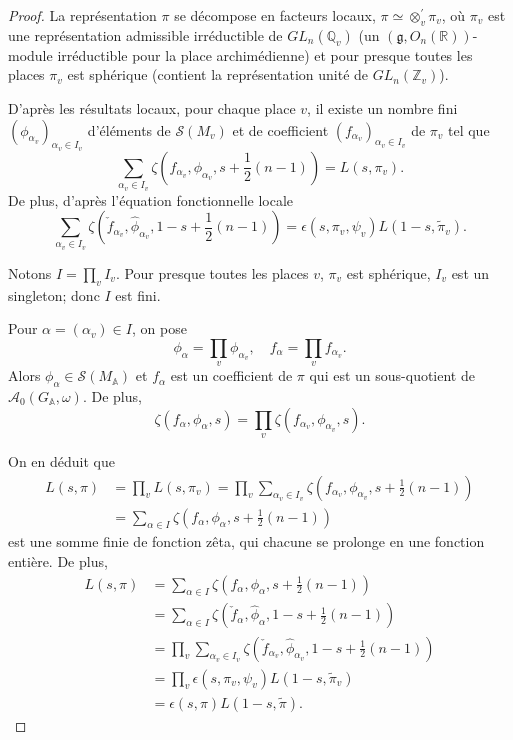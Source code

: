 \begin{proof}
La représentation $\pi$ se décompose en facteurs locaux,
$\pi \simeq \otimes_v^{'} \pi_v$, où $\pi_v$ est une représentation admissible irréductible de $GL_n(\mathbb{Q}_v)$ (un $(\mathfrak{g}, O_n(\mathbb{R}))$-module irréductible pour la place archimédienne) et pour presque toutes les places $\pi_v$ est sphérique (contient la représentation unité de $GL_n(\mathbb{Z}_v)$).

D'après les résultats locaux, pour chaque place $v$, il existe un nombre fini $(\phi_{\alpha_v})_{\alpha_v \in I_v}$ d'éléments de $\mathcal{S}(M_v)$ et de coefficient $(f_{\alpha_v})_{\alpha_v \in I_v}$ de $\pi_v$ tel que
\begin{equation}
\sum_{\alpha_v \in I_v} \zeta(f_{\alpha_v}, \phi_{\alpha_v}, s + \frac{1}{2}(n-1)) = L(s, \pi_v).
\end{equation}
De plus, d'après l'équation fonctionnelle locale
\begin{equation}
\sum_{\alpha_v \in I_v} \zeta(\check{f}_{\alpha_v}, \hat{\phi}_{\alpha_v}, 1-s + \frac{1}{2}(n-1)) = \epsilon(s,\pi_v,\psi_v)L(1-s, \tilde{\pi}_v).
\end{equation}

Notons $I = \prod_v I_v$. Pour presque toutes les places $v$, $\pi_v$ est sphérique, $I_v$ est un singleton; donc $I$ est fini.

Pour $\alpha = (\alpha_v) \in I$, on pose
\begin{equation}
\phi_\alpha = \prod_v \phi_{\alpha_v}, \quad f_\alpha = \prod_v f_{\alpha_v}.
\end{equation}
Alors $\phi_\alpha \in \mathcal{S}(M_\mathbb{A})$ et $f_\alpha$ est un coefficient de $\pi$ qui est un sous-quotient de $\mathcal{A}_0(G_\mathbb{A}, \omega)$. De plus,
\begin{equation}
\zeta(f_\alpha, \phi_\alpha, s) = \prod_v \zeta(f_{\alpha_v}, \phi_{\alpha_v}, s).
\end{equation}

On en déduit que
\begin{align}
L(s, \pi) &= \prod_v L(s, \pi_v) = \prod_v \sum_{\alpha_v \in I_v} \zeta(f_{\alpha_v}, \phi_{\alpha_v}, s + \frac{1}{2}(n-1)) \\
&= \sum_{\alpha \in I} \zeta(f_\alpha, \phi_\alpha, s + \frac{1}{2}(n-1))
\end{align}
est une somme finie de fonction zêta, qui chacune se prolonge en une fonction entière. De plus,
\begin{align}
L(s, \pi) &= \sum_{\alpha \in I} \zeta(f_\alpha, \phi_\alpha, s + \frac{1}{2}(n-1)) \\
&= \sum_{\alpha \in I} \zeta(\check{f}_\alpha, \hat{\phi}_\alpha, 1 - s + \frac{1}{2}(n-1)) \\
&= \prod_v \sum_{\alpha_v \in I_v} \zeta(\check{f}_{\alpha_v}, \hat{\phi}_{\alpha_v}, 1-s + \frac{1}{2}(n-1)) \\
&= \prod_v \epsilon(s, \pi_v, \psi_v) L(1-s, \tilde{\pi}_v) \\
&= \epsilon(s, \pi)L(1-s, \tilde{\pi}).
\end{align}
\end{proof}